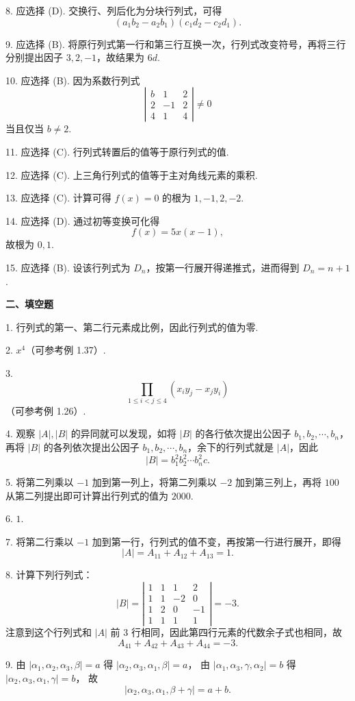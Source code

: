 \documentclass[UTF8,12pt,a4paper,fontset=fandol]{ctexart}
\begin{document}
8. 应选择 (D). 交换行、列后化为分块行列式，可得
\[
(a_1b_2-a_2b_1)(c_1d_2-c_2d_1).
\]

9. 应选择 (B). 将原行列式第一行和第三行互换一次，行列式改变符号，再将三行分别提出因子 $3,2,-1$，故结果为 $6d$.

10. 应选择 (B). 因为系数行列式
\[
\left|\begin{array}{ccc}
b&1&2\\
2&-1&2\\
4&1&4
\end{array}\right|\ne0
\]
当且仅当 $b\ne2$.

11. 应选择 (C). 行列式转置后的值等于原行列式的值.

12. 应选择 (C). 上三角行列式的值等于主对角线元素的乘积.

13. 应选择 (C). 计算可得 $f(x)=0$ 的根为 $1,-1,2,-2$.

14. 应选择 (D). 通过初等变换可化得
\[
f(x)=5x(x-1),
\]
故根为 $0,1$.

15. 应选择 (B). 设该行列式为 $D_n$，按第一行展开得递推式，进而得到 $D_n=n+1$.

\noindent\textbf{二、填空题}

1. 行列式的第一、第二行元素成比例，因此行列式的值为零.

2. $x^4$（可参考例 1.37）.

3. 
\[
\prod_{1\le i<j\le4}(x_iy_j-x_jy_i)
\]
（可参考例 1.26）.

4. 观察 $|A|,|B|$ 的异同就可以发现，如将 $|B|$ 的各行依次提出公因子 $b_1,b_2,\cdots,b_n$，
再将 $|B|$ 的各列依次提出公因子 $b_1,b_2,\cdots,b_n$，余下的行列式就是 $|A|$，因此
\[
|B|=b_1^2b_2^2\cdots b_n^2c.
\]

5. 将第二列乘以 $-1$ 加到第一列上，将第二列乘以 $-2$ 加到第三列上，再将 $100$ 从第二列提出即可计算出行列式的值为 $2000$.

6. $1$.

7. 将第二行乘以 $-1$ 加到第一行，行列式的值不变，再按第一行进行展开，即得
\[
|A|=A_{11}+A_{12}+A_{13}=1.
\]

8. 计算下列行列式：
\[
|B|=\left|\begin{array}{cccc}
1&1&1&2\\
1&1&-2&0\\
1&2&0&-1\\
1&1&1&1
\end{array}\right|=-3.
\]
注意到这个行列式和 $|A|$ 前 $3$ 行相同，因此第四行元素的代数余子式也相同，故
\[
A_{41}+A_{42}+A_{43}+A_{44}=-3.
\]

9. 由 $|\alpha_1,\alpha_2,\alpha_3,\beta|=a$ 得 $|\alpha_2,\alpha_3,\alpha_1,\beta|=a$，
由 $|\alpha_1,\alpha_3,\gamma,\alpha_2|=b$ 得 $|\alpha_2,\alpha_3,\alpha_1,\gamma|=b$，
故
\[
|\alpha_2,\alpha_3,\alpha_1,\beta+\gamma|=a+b.
\]
\end{document}
